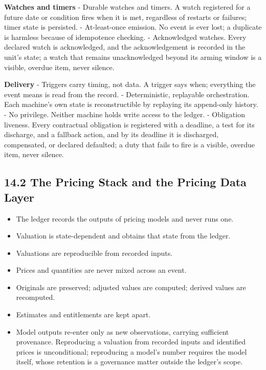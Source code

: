 \documentclass[11pt,a4paper]{article}
\newcommand{\clabel}[1]{\leavevmode\hypertarget{clause-#1}{}%
  \marginpar{\raggedright\scriptsize\ttfamily\textcolor{gray}{#1}}}
\providecommand{\tightlist}{\setlength{\itemsep}{2pt}\setlength{\parskip}{0pt}}
\begin{document}
\textbf{Watches and timers} - \clabel{C-14.2}Durable watches and timers. A watch
registered for a future date or condition fires when it is met,
regardless of restarts or failures; timer state is persisted. -
\clabel{C-14.3}At-least-once emission. No event is ever lost; a duplicate is harmless
because of idempotence checking. - \clabel{C-14.4}Acknowledged watches. Every declared
watch is acknowledged, and the acknowledgement is recorded in the unit's
state; a watch that remains unacknowledged beyond its arming window is a
visible, overdue item, never silence.

\textbf{Delivery} - \clabel{C-14.5}Triggers carry timing, not data. A trigger says
when; everything the event means is read from the record. -
\clabel{C-14.6}Deterministic, replayable orchestration. Each machine's own state is
reconstructible by replaying its append-only history. - \clabel{C-14.7}No privilege.
Neither machine holds write access to the ledger. - \clabel{C-14.8}Obligation liveness.
Every contractual obligation is registered with a deadline, a test for
its discharge, and a fallback action, and by its deadline it is
discharged, compensated, or declared defaulted; a duty that fails to
fire is a visible, overdue item, never silence.

\hypertarget{the-pricing-stack-and-the-pricing-data-layer}{%
\subsection{14.2 The Pricing Stack and the Pricing Data
Layer}\label{the-pricing-stack-and-the-pricing-data-layer}}

\begin{itemize}
\tightlist
\item
  \clabel{C-14.9}The ledger records the outputs of pricing models and never runs one.
\item
  \clabel{C-14.10}Valuation is state-dependent and obtains that state from the ledger.
\item
  \clabel{C-14.11}Valuations are reproducible from recorded inputs.
\item
  \clabel{C-14.12}Prices and quantities are never mixed across an event.
\item
  \clabel{C-14.13}Originals are preserved; adjusted values are computed; derived values
  are recomputed.
\item
  \clabel{C-14.14}Estimates and entitlements are kept apart.
\item
  \clabel{C-14.15}Model outputs re-enter only as new observations, carrying sufficient
  provenance. Reproducing a valuation from recorded inputs and
  identified prices is unconditional; reproducing a model's number
  requires the model itself, whose retention is a governance matter
  outside the ledger's scope.
\end{itemize}
\end{document}
